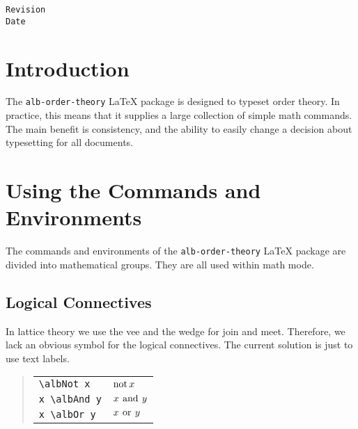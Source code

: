 \documentclass[11pt,a4paper,oneside]{alb-corp}
\begin{document}
\begin{albTitlePage}

  \verb$Revision$\\
  \verb$Date$

\end{albTitlePage}




\section{Introduction}
\label{sec:alb-order-theory-documentation:intr}

The \texttt{alb-order-theory} \LaTeX{} package is designed to typeset
order theory.  In practice, this means that it supplies a large
collection of simple math commands.  The main benefit is consistency,
and the ability to easily change a decision about typesetting for all
documents.




\section{Using the Commands and Environments}
\label{sec:alb-order-theory-documentation:using-comm-envir}

The commands and environments of the \texttt{alb-order-theory} \LaTeX{}
package are divided into mathematical groups.  They are all used within
math mode.



\subsection{Logical Connectives}
\label{sec:alb-order-theory-documentation:logical-conn}

In lattice theory we use the vee and the wedge for join and meet.
Therefore, we lack an obvious symbol for the logical connectives.  The
current solution is just to use text labels.

\begin{quote}
  \begin{tabular}{p{}@{\qquad}p{}}
    \verb$\albNot x$ & $\mathop{\mathrm{not}} x$ \\
    \verb$x \albAnd y$ & $x \mathbin{\,\mathrm{and}\,} y$ \\
    \verb$x \albOr y$ & $x \mathbin{\,\mathrm{or}\,} y$
  \end{tabular}
\end{quote}
\end{document}

